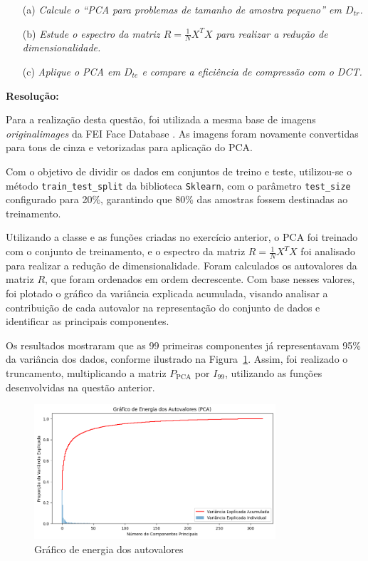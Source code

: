 \documentclass[a4paper, 11pt]{article}
\begin{document}
\begin{enumerate}
    \item[(a)] \textit{Calcule o \emph{“PCA para problemas de tamanho de amostra pequeno”} em \( D_{tr} \).}
    \item[(b)] \textit{Estude o espectro da matriz \( R = \frac{1}{N} X^T X \) para realizar a redução de dimensionalidade.}
    \item[(c)] \textit{Aplique o PCA em \( D_{te} \) e compare a eficiência de compressão com o DCT.}
\end{enumerate}

\textbf{Resolução:}

Para a realização desta questão, foi utilizada a mesma base de imagens \textit{originalimages} da FEI Face Database \cite{FEI}. As imagens foram novamente convertidas para tons de cinza e vetorizadas para aplicação do PCA.

Com o objetivo de dividir os dados em conjuntos de treino e teste, utilizou-se o método \texttt{train\_test\_split} da biblioteca \texttt{Sklearn}, com o parâmetro \texttt{test\_size} configurado para 20\%, garantindo que 80\% das amostras fossem destinadas ao treinamento.

Utilizando a classe e as funções criadas no exercício anterior, o PCA foi treinado com o conjunto de treinamento, e o espectro da matriz \( R = \frac{1}{N}X^TX \) foi analisado para realizar a redução de dimensionalidade. Foram calculados os autovalores da matriz \(R\), que foram ordenados em ordem decrescente. Com base nesses valores, foi plotado o gráfico da variância explicada acumulada, visando analisar a contribuição de cada autovalor na representação do conjunto de dados e identificar as principais componentes. 

Os resultados mostraram que as 99 primeiras componentes já representavam 95\% da variância dos dados, conforme ilustrado na Figura~\ref{fig:var2}. Assim, foi realizado o truncamento, multiplicando a matriz \( P_{\text{PCA}} \) por \( I_{99} \), utilizando as funções desenvolvidas na questão anterior.

\begin{figure} [h]
    \centering 
    \includegraphics[width=0.8\textwidth]{imgs/var2.png}
    \caption{Gráfico de energia dos autovalores}
    \label{fig:var2} %
\end{figure}
\end{document}

